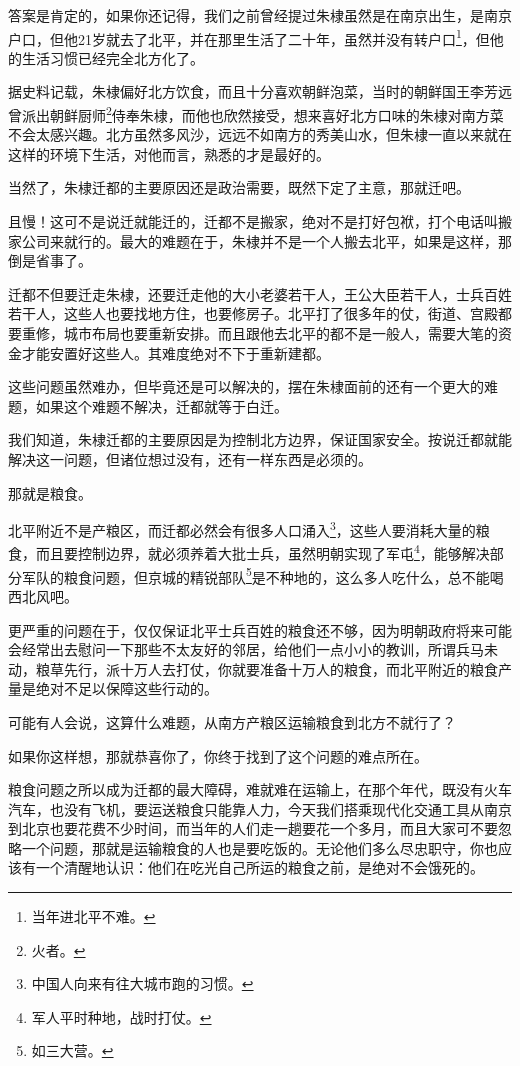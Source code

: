 \begin{multicols}{\theparacolNo}
答案是肯定的，如果你还记得，我们之前曾经提过朱棣虽然是在南京出生，是南京户口，但他21岁就去了北平，并在那里生活了二十年，虽然并没有转户口\footnote{当年进北平不难。}，但他的生活习惯已经完全北方化了。

据史料记载，朱棣偏好北方饮食，而且十分喜欢朝鲜泡菜，当时的朝鲜国王李芳远曾派出朝鲜厨师\footnote{火者。}侍奉朱棣，而他也欣然接受，想来喜好北方口味的朱棣对南方菜不会太感兴趣。北方虽然多风沙，远远不如南方的秀美山水，但朱棣一直以来就在这样的环境下生活，对他而言，熟悉的才是最好的。

当然了，朱棣迁都的主要原因还是政治需要，既然下定了主意，那就迁吧。

且慢！这可不是说迁就能迁的，迁都不是搬家，绝对不是打好包袱，打个电话叫搬家公司来就行的。最大的难题在于，朱棣并不是一个人搬去北平，如果是这样，那倒是省事了。

迁都不但要迁走朱棣，还要迁走他的大小老婆若干人，王公大臣若干人，士兵百姓若干人，这些人也要找地方住，也要修房子。北平打了很多年的仗，街道、宫殿都要重修，城市布局也要重新安排。而且跟他去北平的都不是一般人，需要大笔的资金才能安置好这些人。其难度绝对不下于重新建都。

这些问题虽然难办，但毕竟还是可以解决的，摆在朱棣面前的还有一个更大的难题，如果这个难题不解决，迁都就等于白迁。

我们知道，朱棣迁都的主要原因是为控制北方边界，保证国家安全。按说迁都就能解决这一问题，但诸位想过没有，还有一样东西是必须的。

那就是粮食。

北平附近不是产粮区，而迁都必然会有很多人口涌入\footnote{中国人向来有往大城市跑的习惯。}，这些人要消耗大量的粮食，而且要控制边界，就必须养着大批士兵，虽然明朝实现了军屯\footnote{军人平时种地，战时打仗。}，能够解决部分军队的粮食问题，但京城的精锐部队\footnote{如三大营。}是不种地的，这么多人吃什么，总不能喝西北风吧。

更严重的问题在于，仅仅保证北平士兵百姓的粮食还不够，因为明朝政府将来可能会经常出去慰问一下那些不太友好的邻居，给他们一点小小的教训，所谓兵马未动，粮草先行，派十万人去打仗，你就要准备十万人的粮食，而北平附近的粮食产量是绝对不足以保障这些行动的。

可能有人会说，这算什么难题，从南方产粮区运输粮食到北方不就行了？

如果你这样想，那就恭喜你了，你终于找到了这个问题的难点所在。

粮食问题之所以成为迁都的最大障碍，难就难在运输上，在那个年代，既没有火车汽车，也没有飞机，要运送粮食只能靠人力，今天我们搭乘现代化交通工具从南京到北京也要花费不少时间，而当年的人们走一趟要花一个多月，而且大家可不要忽略一个问题，那就是运输粮食的人也是要吃饭的。无论他们多么尽忠职守，你也应该有一个清醒地认识：他们在吃光自己所运的粮食之前，是绝对不会饿死的。


\end{multicols}
